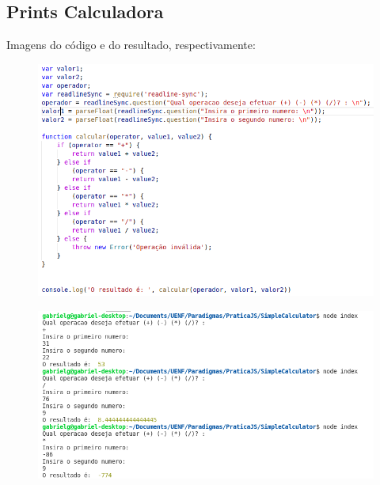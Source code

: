     \subsection{Prints Calculadora}
	
	Imagens do código e do resultado, respectivamente: 
	\begin{figure}[h]
		\centering
		\includegraphics[width=0.9\linewidth]{Pictures/CalcCode}
		\caption{}
		\label{fig:calccode}
	\end{figure}
	\begin{figure}[h]
		\centering
		\includegraphics[width=0.9\linewidth]{Pictures/CalcResult}
		\caption{}
		\label{fig:calcresult}
	\end{figure}
	



